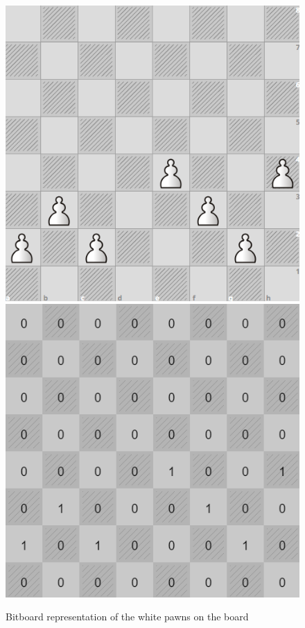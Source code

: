 \begin{figure}[H]
    \centering
    \includegraphics[scale=0.25]{images/PawnBitboard.png}
    \includegraphics[scale=0.26]{images/PawnBitboardVals.png}
    \caption{Bitboard representation of the white pawns on the board}
    \label{fig: pawnBitboards}
\end{figure}

